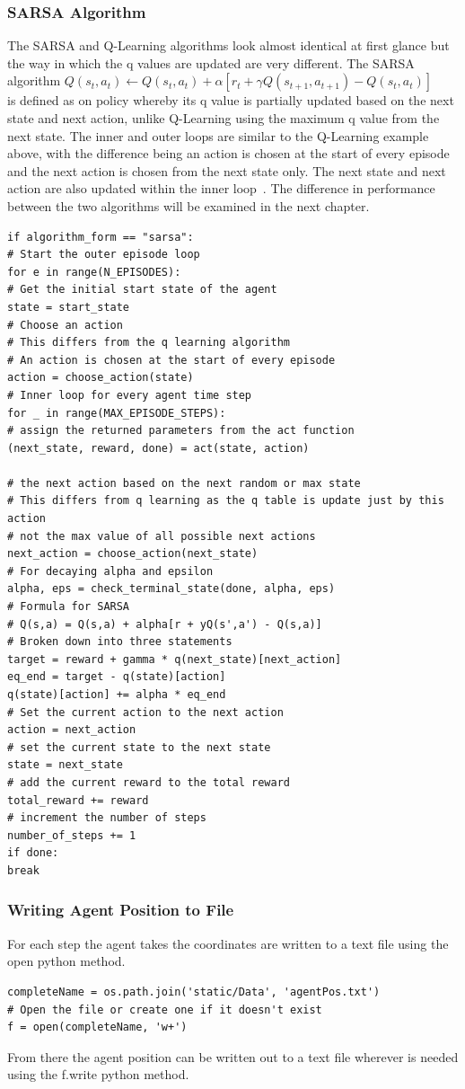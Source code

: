 \subsubsection{SARSA Algorithm}
The SARSA and Q-Learning algorithms look almost identical at first glance but the way in which the q values are updated are very different. The SARSA~\cite{LITTMAN1994157} algorithm $Q(s_{t},a_{t})\leftarrow Q(s_{t},a_{t})+\alpha [r_{t}+\gamma Q(s_{t+1},a_{t+1})-Q(s_{t},a_{t})]$~\cite{Stateac29:online}\\ is defined as on policy whereby its q value is partially updated based on the next state and next action, unlike Q-Learning using the maximum q value from the next state. The inner and outer loops are similar to the Q-Learning example above, with the difference being an action is chosen at the start of every episode and the next action is chosen from the next state only. The next state and next action are also updated within the inner loop~\cite{Watkins1992}. The difference in performance between the two algorithms will be examined in the next chapter.
\begin{verbatim}
if algorithm_form == "sarsa":
# Start the outer episode loop
for e in range(N_EPISODES):
# Get the initial start state of the agent
state = start_state
# Choose an action
# This differs from the q learning algorithm
# An action is chosen at the start of every episode
action = choose_action(state)
# Inner loop for every agent time step
for _ in range(MAX_EPISODE_STEPS):
# assign the returned parameters from the act function
(next_state, reward, done) = act(state, action)

# the next action based on the next random or max state
# This differs from q learning as the q table is update just by this action
# not the max value of all possible next actions
next_action = choose_action(next_state)
# For decaying alpha and epsilon
alpha, eps = check_terminal_state(done, alpha, eps)
# Formula for SARSA
# Q(s,a) = Q(s,a) + alpha[r + yQ(s',a') - Q(s,a)]
# Broken down into three statements
target = reward + gamma * q(next_state)[next_action]
eq_end = target - q(state)[action]
q(state)[action] += alpha * eq_end
# Set the current action to the next action
action = next_action
# set the current state to the next state
state = next_state
# add the current reward to the total reward
total_reward += reward
# increment the number of steps
number_of_steps += 1
if done:
break

\end{verbatim}
\subsubsection{Writing Agent Position to File}
For each step the agent takes the coordinates are written to a text file using the open python method.
\begin{verbatim}
completeName = os.path.join('static/Data', 'agentPos.txt')
# Open the file or create one if it doesn't exist
f = open(completeName, 'w+')
\end{verbatim}
From there the agent position can be written out to a text file wherever is needed using the f.write python method.

